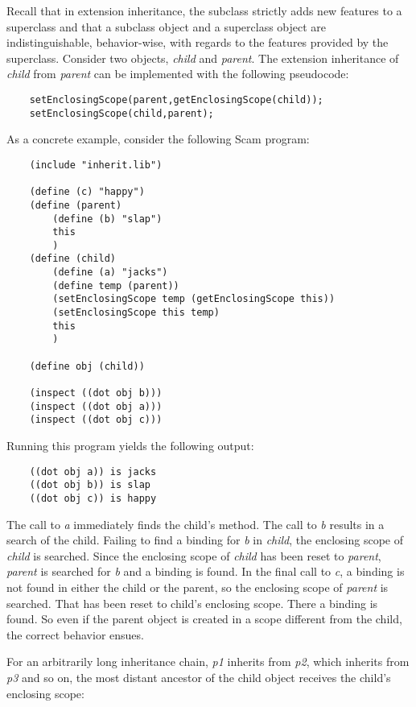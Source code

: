 Recall that in extension inheritance, the subclass strictly adds
new features to a superclass and that a subclass object and a
superclass object are indistinguishable, behavior-wise, with regards
to the features provided by the superclass.  
Consider two objects, {\it child} and {\it parent}. The extension
inheritance of {\it child} from {\it parent} can be implemented with
the following pseudocode:

\begin{verbatim}
    setEnclosingScope(parent,getEnclosingScope(child));
    setEnclosingScope(child,parent);
\end{verbatim}

As a concrete example, consider the following Scam program:

\begin{verbatim}
    (include "inherit.lib")

    (define (c) "happy")
    (define (parent)
        (define (b) "slap")
        this
        )
    (define (child)
        (define (a) "jacks")
        (define temp (parent))
        (setEnclosingScope temp (getEnclosingScope this))
        (setEnclosingScope this temp)
        this
        )

    (define obj (child))

    (inspect ((dot obj b)))
    (inspect ((dot obj a)))
    (inspect ((dot obj c)))
\end{verbatim}

Running this program yields the following output:

\begin{verbatim}
    ((dot obj a)) is jacks
    ((dot obj b)) is slap
    ((dot obj c)) is happy
\end{verbatim}

The call to {\it a} immediately finds the child's method.  The call to
{\it b} results in a search of the child. Failing to find a binding
for {\it b} in {\it child}, the enclosing scope of {\it child} is
searched. Since the enclosing scope of {\it child} has been reset to {\it
parent}, {\it parent} is searched for {\it b} and a binding is found.
In the final call to {\it c}, a binding is not found in either the
child or the parent, so the enclosing scope of {\it parent} is searched.
That has been reset to {\sc child}'s enclosing scope. There a binding
is found. So even if the parent object is created in a scope different
from the child, the correct behavior ensues.

For an arbitrarily long inheritance chain, {\it p1} inherits from {\it
p2}, which inherits from {\it p3} and so on, the most distant ancestor
of the child object receives the child's enclosing scope:

